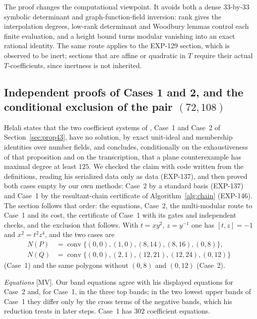 \documentclass[11pt]{article}
\theoremstyle{remark}
\begin{document}
The proof changes the computational viewpoint. It avoids both a dense
33-by-33 symbolic determinant and graph-function-field inversion: rank gives
the interpolation degrees, low-rank determinant and Woodbury lemmas control
each finite evaluation, and a height bound turns modular vanishing into an
exact rational identity. The same route applies to the EXP-129 section, which is
observed to be inert; sections that are affine or quadratic in \(T\) require their
actual \(T\)-coefficients, since inertness is not inherited.

\subsection{Independent proofs of Cases 1 and 2, and the conditional exclusion of the pair \texorpdfstring{$(72,108)$}{(72,108)}}\label{sec:helali}

Helali \cite{Helali2026} states that the two coefficient systems of \cite[Proposition~4.3]{GGHV2022}, Case~1 and Case~2 of
Section~\ref{sec:prop43}, have no solution, by exact unit-ideal and membership identities over number fields, and concludes,
conditionally on the exhaustiveness of that proposition and on the transcription, that a plane counterexample has maximal
degree at least $125$. We checked the claim with code written from the definitions, reading his serialized data only as data
(EXP-137), and then proved both cases empty by our own methods: Case~2 by a standard basis (EXP-137) and Case~1 by the resultant-chain certificate of
Algorithm~\ref{alg:chain} (EXP-146). The section follows that order: the equations, Case~2, the multi-modular route to Case~1 and its cost, the certificate of Case~1 with its gates and independent checks, and the exclusion that follows. With $t=xy^2$, $z=y^{-1}$ one has $[t,z]=-1$ and $x^2=t^2z^4$, and the two cases are
\begin{align*}
N(P)&=\operatorname{conv}\{(0,0),(1,0),(8,14),(8,16),(0,8)\},\\
N(Q)&=\operatorname{conv}\{(0,0),(2,1),(12,21),(12,24),(0,12)\}
\end{align*}
(Case~1) and the same polygons without $(0,8)$ and $(0,12)$ (Case~2).

\emph{Equations} [MV]. Our band equations agree with his displayed equations for Case~2 and, for Case~1, in the three top bands; in the
two lowest upper bands of Case~1 they differ only by the cross terms of the negative bands, which his
reduction treats in later steps. Case~1 has $302$ coefficient equations.
\end{document}
